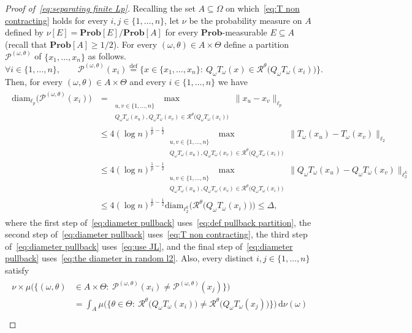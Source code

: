 \documentclass[11pt,reqno]{amsart}
\renewcommand{\le}{\leqslant}
\renewcommand{\ge}{\geqslant}
\newcommand{\ud}[0]{\,\mathrm{d}}
\newcommand{\diam}{\mathrm{diam}}
\newcommand{\n}{\{1,\ldots,n\}}
\theoremstyle{remark}
\renewcommand{\subset}{\subseteq}
\newcommand{\eqdef}{\stackrel{\mathrm{def}}{=}}
\renewcommand{\Pr}{\mathbf{Prob}}
\renewcommand{\1}{\mathbf 1}
\begin{document}
\begin{proof}[Proof of~\eqref{eq:separating finite Lp}]
Recalling the set $A\subset \Omega$ on which~\eqref{eq:T non contracting} holds for every $i,j\in \n$, let $\nu$ be the probability measure on $A$ defined by $\nu[E] =\Pr[E]/\Pr[A]$ for every $\Pr$-measurable $E\subset A$ (recall that $\Pr[A]\ge 1/2$). For every $(\omega,\theta)\in A\times \Theta$ define a partition $\mathscr{P}^{(\omega,\theta)}$ of $\{x_1,\ldots,x_n\}$ as follows.
\begin{equation}\label{eq:def pullback partition}
\forall  i\in \n,\qquad \mathscr{P}^{(\omega,\theta)}(x_i)\eqdef \Big\{x\in \{x_1,\ldots,x_n\}:\ Q_\omega T_\omega (x)\in \mathscr{R}^\theta \big(Q_\omega T_\omega(x_i)\big)\Big\}.
\end{equation}
Then, for every $(\omega,\theta)\in A\times \Theta$ and every $i\in \n$ we have
\begin{align}\label{eq:diameter pullback}
\begin{split}
 \diam_{{\ell}_p}\big(\mathscr{P}^{(\omega,\theta)}(x_i)\big)&=
 \max_{\substack{u,v\in \n\\ Q_\omega T_\omega (x_u),Q_\omega T_\omega (x_v)\in \mathscr{R}^\theta \big(Q_\omega T_\omega(x_i)\big)}}\|x_u-x_v\|_{{\ell}_p}\\&\le 4(\log n)^{\frac{1}{p}-\frac12}\max_{\substack{u,v\in \n\\ Q_\omega T_\omega (x_u),Q_\omega T_\omega (x_v)\in \mathscr{R}^\theta \big(Q_\omega T_\omega(x_i)\big)}}\|T_\omega(x_u)-T_\omega(x_v)\|_{{\ell}_2}
\\&\le 4(\log n)^{\frac{1}{p}-\frac12}\max_{\substack{u,v\in \n\\ Q_\omega T_\omega (x_u),Q_\omega T_\omega (x_v)\in \mathscr{R}^\theta \big(Q_\omega T_\omega(x_i)\big)}}\|Q_\omega T_\omega(x_u)-Q_{\omega}T_\omega(x_v)\|_{\ell_2^k}\\
&\le 4(\log n)^{\frac{1}{p}-\frac12}\diam_{\ell_2^k} \Big(\mathscr{R}^\theta \big(Q_\omega T_\omega(x_i)\big)\Big)\le \Delta,
\end{split}
\end{align}
where the first step of~\eqref{eq:diameter pullback} uses~\eqref{eq:def pullback partition}, the second step of~\eqref{eq:diameter pullback} uses~\eqref{eq:T non contracting}, the third step of~\eqref{eq:diameter pullback} uses~\eqref{eq:use JL}, and the final step of~\eqref{eq:diameter pullback} uses~\eqref{eq:the diameter in random l2}.
Also, every distinct $i,j\in \n$ satisfy
\begin{align}\label{eq:separation pullback}
\begin{split}
\nu\times \mu \Big(\Big\{(\omega,\theta)&\in A\times \Theta:\ \mathscr{P}^{(\omega,\theta)}(x_i)\neq \mathscr{P}^{(\omega,\theta)}(x_j)\Big\}\Big)\\ &=\int_A \mu\Big(\Big\{\theta\in \Theta:\  \mathscr{R}^\theta \big(Q_\omega T_\omega(x_i)\big)\neq \mathscr{R}^\theta \big(Q_\omega T_\omega(x_j)\big)\Big\}\Big) \ud \nu(\omega) \\

\end{split}
\end{align}
\end{proof}
\end{document}

